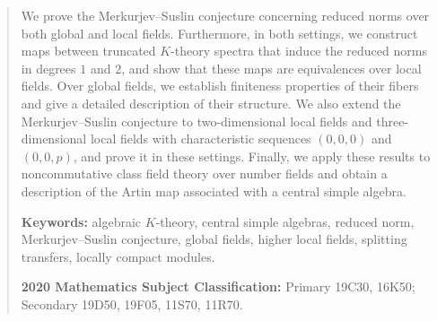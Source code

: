 \begin{abstract}
We prove the Merkurjev--Suslin conjecture concerning reduced norms over both global and local fields.
Furthermore, in both settings, we construct maps between truncated $K$-theory spectra that induce the reduced norms in degrees $1$ and $2$, and show that these maps are equivalences over local fields.
Over global fields, we establish finiteness properties of their fibers and give a detailed description of their structure.
We also extend the Merkurjev--Suslin conjecture to two-dimensional local fields and three-dimensional local fields with characteristic sequences $(0,0,0)$ and $(0,0,p)$, and prove it in these settings.
Finally, we apply these results to noncommutative class field theory over number fields and obtain a description of the Artin map associated with a central simple algebra.

\medskip
\noindent\textbf{Keywords:} algebraic $K$-theory, central simple algebras, reduced norm, Merkurjev--Suslin conjecture, global fields, higher local fields, splitting transfers, locally compact modules.

\smallskip
\noindent\textbf{2020 Mathematics Subject Classification:} Primary 19C30, 16K50; Secondary 19D50, 19F05, 11S70, 11R70.
\end{abstract}
